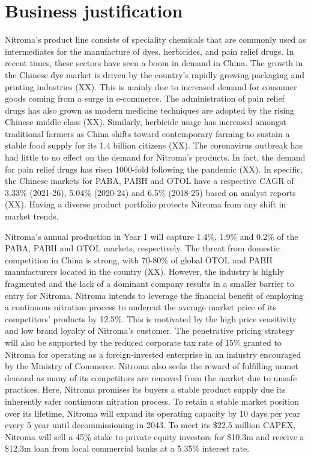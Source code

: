 \section*{Business justification}


Nitroma’s product line consists of speciality chemicals that are commonly used as intermediates for the manufacture of dyes, herbicides, and pain relief drugs. In recent times, these sectors have seen a boom in demand in China. The growth in the Chinese dye market is driven by the country’s rapidly growing packaging and printing industries (XX). This is mainly due to increased demand for consumer goods coming from a surge in e-commerce. The administration of pain relief drugs has also grown as modern medicine techniques are adopted by the rising Chinese middle class (XX). Similarly, herbicide usage has increased amongst traditional farmers as China shifts toward contemporary farming to sustain a stable food supply for its 1.4 billion citizens (XX). The coronavirus outbreak has had little to no effect on the demand for Nitroma’s products. In fact, the demand for pain relief drugs has risen 1000-fold following the pandemic (XX). In specific, the Chinese markets for PABA, PABH and OTOL have a respective CAGR of 3.33\% (2021-26), 5.04\% (2020-24) and 6.5\% (2018-25) based on analyst reports (XX). Having a diverse product portfolio protects Nitroma from any shift in market trends.

Nitroma’s annual production in Year 1 will capture 1.4\%, 1.9\% and 0.2\% of the PABA, PABH and OTOL markets, respectively. The threat from domestic competition in China is strong, with 70-80\% of global OTOL and PABH manufacturers located in the country (XX). However, the industry is highly fragmented and the lack of a dominant company results in a smaller barrier to entry for Nitroma. Nitroma intends to leverage the financial benefit of employing a continuous nitration process to undercut the average market price of its competitors’ products by 12.5\%. This is motivated by the high price sensitivity and low brand loyalty of Nitroma’s customer. The penetrative pricing strategy will also be supported by the reduced corporate tax rate of 15\% granted to Nitroma for operating as a foreign-invested enterprise in an industry encouraged by the Ministry of Commerce. Nitroma also seeks the reward of fulfilling unmet demand as many of its competitors are removed from the market due to unsafe practices. Here, Nitroma promises its buyers a stable product supply due its inherently safer continuous nitration process. To retain a stable market position over its lifetime, Nitroma will expand its operating capacity by 10 days per year every 5 year until decommissioning in 2043. To meet its \$22.5 million CAPEX, Nitroma will sell a 45\% stake to private equity investors for \$10.3m 
and receive a \$12.3m loan from local commercial banks at a 5.35\% interest rate.

